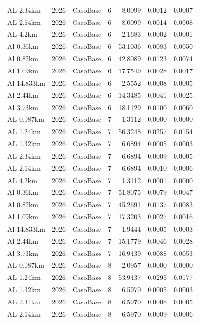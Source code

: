 \documentclass[11pt,a4paper]{article}
\begin{document}
\begin{longtable}{llllrrr}
AL 2.34km & 2026 & CasoBase & 6 & 8.0099 & 0.0012 & 0.0007 \\
AL 2.64km & 2026 & CasoBase & 6 & 8.0099 & 0.0014 & 0.0008 \\
AL 4.2km & 2026 & CasoBase & 6 & 2.1683 & 0.0002 & 0.0001 \\
Al 0.36km & 2026 & CasoBase & 6 & 53.1036 & 0.0083 & 0.0050 \\
Al 0.82km & 2026 & CasoBase & 6 & 42.8089 & 0.0123 & 0.0074 \\
Al 1.09km & 2026 & CasoBase & 6 & 17.7549 & 0.0028 & 0.0017 \\
Al 14.833km & 2026 & CasoBase & 6 & 2.5552 & 0.0008 & 0.0005 \\
Al 2.44km & 2026 & CasoBase & 6 & 14.3485 & 0.0041 & 0.0025 \\
Al 3.73km & 2026 & CasoBase & 6 & 18.1129 & 0.0100 & 0.0060 \\
AL 0.087km & 2026 & CasoBase & 7 & 1.3112 & 0.0000 & 0.0000 \\
AL 1.24km & 2026 & CasoBase & 7 & 50.3248 & 0.0257 & 0.0154 \\
AL 1.32km & 2026 & CasoBase & 7 & 6.6894 & 0.0005 & 0.0003 \\
AL 2.34km & 2026 & CasoBase & 7 & 6.6894 & 0.0009 & 0.0005 \\
AL 2.64km & 2026 & CasoBase & 7 & 6.6894 & 0.0010 & 0.0006 \\
AL 4.2km & 2026 & CasoBase & 7 & 1.3112 & 0.0001 & 0.0000 \\
Al 0.36km & 2026 & CasoBase & 7 & 51.8075 & 0.0079 & 0.0047 \\
Al 0.82km & 2026 & CasoBase & 7 & 45.2691 & 0.0137 & 0.0083 \\
Al 1.09km & 2026 & CasoBase & 7 & 17.3203 & 0.0027 & 0.0016 \\
Al 14.833km & 2026 & CasoBase & 7 & 1.9444 & 0.0005 & 0.0003 \\
Al 2.44km & 2026 & CasoBase & 7 & 15.1779 & 0.0046 & 0.0028 \\
Al 3.73km & 2026 & CasoBase & 7 & 16.9439 & 0.0088 & 0.0053 \\
AL 0.087km & 2026 & CasoBase & 8 & 2.0957 & 0.0000 & 0.0000 \\
AL 1.24km & 2026 & CasoBase & 8 & 53.9437 & 0.0295 & 0.0177 \\
AL 1.32km & 2026 & CasoBase & 8 & 6.5970 & 0.0005 & 0.0003 \\
AL 2.34km & 2026 & CasoBase & 8 & 6.5970 & 0.0008 & 0.0005 \\
AL 2.64km & 2026 & CasoBase & 8 & 6.5970 & 0.0009 & 0.0006 \\

\end{longtable}
\end{document}
